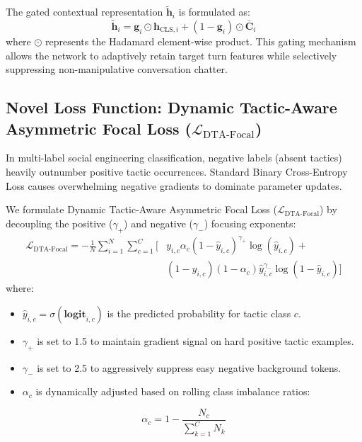 \documentclass[10pt,conference]{IEEEtran}
\begin{document}
The gated contextual representation $\tilde{\mathbf{h}}_i$ is formulated as:
\begin{equation}
\tilde{\mathbf{h}}_i = \mathbf{g}_i \odot \mathbf{h}_{\text{CLS}, i} + (1 - \mathbf{g}_i) \odot \bar{\mathbf{C}}_i
\end{equation}
where $\odot$ represents the Hadamard element-wise product. This gating mechanism allows the network to adaptively retain target turn features while selectively suppressing non-manipulative conversation chatter.

\subsection{Novel Loss Function: Dynamic Tactic-Aware Asymmetric Focal Loss ($\mathcal{L}_{\text{DTA-Focal}}$)}
In multi-label social engineering classification, negative labels (absent tactics) heavily outnumber positive tactic occurrences. Standard Binary Cross-Entropy Loss causes overwhelming negative gradients to dominate parameter updates.

We formulate Dynamic Tactic-Aware Asymmetric Focal Loss ($\mathcal{L}_{\text{DTA-Focal}}$) by decoupling the positive ($\gamma_+$) and negative ($\gamma_-$) focusing exponents:
\begin{equation}
\begin{aligned}
\mathcal{L}_{\text{DTA-Focal}} = -\frac{1}{N} \sum_{i=1}^N \sum_{c=1}^C \Big[ & y_{i,c} \alpha_c (1 - \hat{y}_{i,c})^{\gamma_+} \log(\hat{y}_{i,c}) + \\
& (1 - y_{i,c}) (1 - \alpha_c) \hat{y}_{i,c}^{\gamma_-} \log(1 - \hat{y}_{i,c}) \Big]
\end{aligned}
\end{equation}
where:
\begin{itemize}
    \item $\hat{y}_{i,c} = \sigma(\mathbf{logit}_{i,c})$ is the predicted probability for tactic class $c$.
    \item $\gamma_+$ is set to 1.5 to maintain gradient signal on hard positive tactic examples.
    \item $\gamma_-$ is set to 2.5 to aggressively suppress easy negative background tokens.
    \item $\alpha_c$ is dynamically adjusted based on rolling class imbalance ratios:
\end{itemize}
\begin{equation}
\alpha_c = 1 - \frac{N_c}{\sum_{k=1}^C N_k}
\end{equation}
\end{document}
